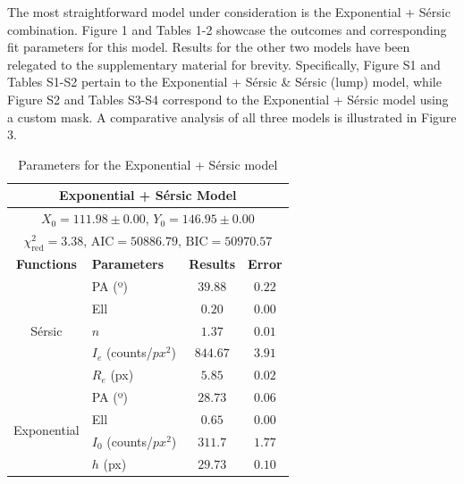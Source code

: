 The most straightforward model under consideration is the Exponential + Sérsic combination. Figure 1 and Tables 1-2 showcase the outcomes and corresponding fit parameters for this model. Results for the other two models have been relegated to the supplementary material for brevity. Specifically, Figure S1 and Tables S1-S2 pertain to the Exponential + Sérsic \& Sérsic (lump) model, while Figure S2 and Tables S3-S4 correspond to the Exponential + Sérsic model using a custom mask. A comparative analysis of all three models is illustrated in Figure 3.


\begin{table}[!htb]
    \centering
    \begin{tabular}{|c|l|c|c|}
        \hline
        \multicolumn{4}{|c|}{\textbf{Exponential + Sérsic Model}} \\
        \hline
        \multicolumn{4}{|c|}{\(X_{0} = 111.98 \pm 0.00\), \(Y_{0} = 146.95 \pm 0.00\)} \\
        \hline
        \multicolumn{4}{|c|}{\(\chi^{2}_{\text{red}} = 3.38\), \(\text{AIC} = 50886.79\), \(\text{BIC} = 50970.57\)} \\
        \hline
        \textbf{Functions} & \textbf{Parameters} & \textbf{Results} & \textbf{Error} \\
        \hline
        \multirow{5}{*}{Sérsic} 
        & PA (º) & \(39.88\) & \(0.22\) \\
        & Ell & \(0.20\) & \(0.00\) \\
        & \(n\) & \(1.37\) & \(0.01\) \\
        & \(I_{e}\) (counts/\(px^{2}\)) & \(844.67\) & \(3.91\) \\
        & \(R_{e}\) (px) & \(5.85\) & \(0.02\) \\
        \hline
        \multirow{4}{*}{Exponential}
        & PA (º) & \(28.73\) & \(0.06\) \\
        & Ell & \(0.65\) & \(0.00\) \\
        & \(I_{0}\) (counts/\(px^{2}\)) & \(311.7\) & \(1.77\) \\
        & \(h\) (px) & \(29.73\) & \(0.10\) \\
        \hline
    \end{tabular}
    \caption{Parameters for the Exponential + Sérsic model}
\end{table}


